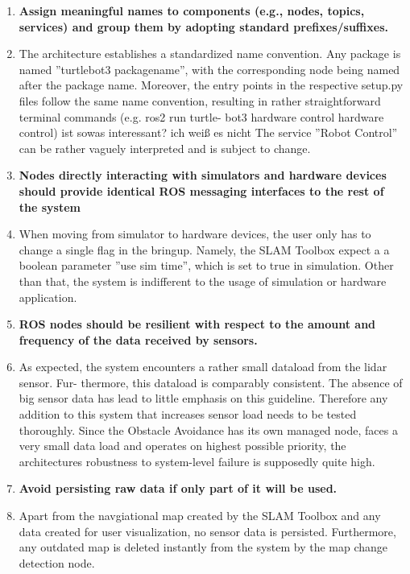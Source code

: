 \documentclass[%
paper=A4,               %
twoside=true,           %
openright,              %
11pt,                   %
bibliography=totoc,     %
titlepage=on,           %
DIV=12,                 %
BCOR=1.5cm,             %
parskip=half,            %
final
]{scrreprt}
\begin{document}
\begin{enumerate}[leftmargin=9mm, align=left]
		\item  \textbf{Assign meaningful names to components (e.g., nodes, topics, services) and group them by adopting standard prefixes/suffixes.} 
		\item[] The architecture establishes a standardized name convention. Any package is named ”turtlebot3 packagename”, with the corresponding node being named after the package name. Moreover, the entry points in the respective setup.py files follow the same name convention, resulting in rather straightforward terminal commands (e.g. ros2 run turtle- bot3 hardware control hardware control) ist sowas interessant? ich weiß es nicht
		The service ”Robot Control” can be rather vaguely interpreted and is subject to change.
		
		\item  \textbf{Nodes directly interacting with simulators and hardware devices should provide identical ROS messaging interfaces to the rest of the system} 
		\item[] When moving from simulator to hardware devices, the user only has to change a single flag in the bringup. Namely, the SLAM Toolbox expect a a boolean parameter ”use sim time”, which is set to true in simulation. Other than that, the system is indifferent to the usage of simulation or hardware application.
		
		\item \textbf{ROS nodes should be resilient with respect to the amount and frequency of the data received by sensors.} 
		\item[] As expected, the system encounters a rather small dataload from the lidar sensor. Fur- thermore, this dataload is comparably consistent. The absence of big sensor data has lead to little emphasis on this guideline. Therefore any addition to this system that increases sensor load needs to be tested thoroughly. Since the Obstacle Avoidance has its own managed node, faces a very small data load and operates on highest possible priority, the architectures robustness to system-level failure is supposedly quite high.
		
		\item \textbf{Avoid persisting raw data if only part of it will be used.}
		\item[] Apart from the navgiational map created by the SLAM Toolbox and any data created for user visualization, no sensor data is persisted. Furthermore, any outdated map is deleted instantly from the system by the map change detection node.
		
		
	\end{enumerate}
	
\end{document}
